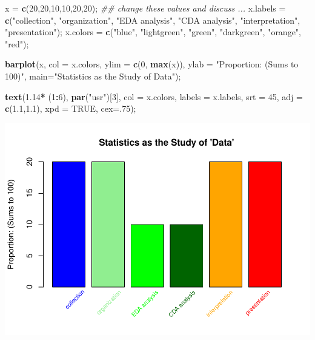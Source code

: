 \documentclass[
]{article}
\newenvironment{Shaded}{\begin{snugshade}}{\end{snugshade}}
\newcommand{\CommentTok}[1]{\textcolor[rgb]{0.56,0.35,0.01}{\textit{#1}}}
\newcommand{\DataTypeTok}[1]{\textcolor[rgb]{0.13,0.29,0.53}{#1}}
\newcommand{\DecValTok}[1]{\textcolor[rgb]{0.00,0.00,0.81}{#1}}
\newcommand{\FloatTok}[1]{\textcolor[rgb]{0.00,0.00,0.81}{#1}}
\newcommand{\KeywordTok}[1]{\textcolor[rgb]{0.13,0.29,0.53}{\textbf{#1}}}
\newcommand{\NormalTok}[1]{#1}
\newcommand{\OperatorTok}[1]{\textcolor[rgb]{0.81,0.36,0.00}{\textbf{#1}}}
\newcommand{\OtherTok}[1]{\textcolor[rgb]{0.56,0.35,0.01}{#1}}
\newcommand{\StringTok}[1]{\textcolor[rgb]{0.31,0.60,0.02}{#1}}
\begin{document}
\begin{Shaded}
\begin{Highlighting}[]
\NormalTok{x =}\StringTok{ }\KeywordTok{c}\NormalTok{(}\DecValTok{20}\NormalTok{,}\DecValTok{20}\NormalTok{,}\DecValTok{10}\NormalTok{,}\DecValTok{10}\NormalTok{,}\DecValTok{20}\NormalTok{,}\DecValTok{20}\NormalTok{);  }\CommentTok{\#\# change these values and discuss ...}
\NormalTok{x.labels =}\StringTok{ }\KeywordTok{c}\NormalTok{(}\StringTok{"collection"}\NormalTok{, }\StringTok{"organization"}\NormalTok{, }\StringTok{"EDA analysis"}\NormalTok{, }\StringTok{"CDA analysis"}\NormalTok{, }\StringTok{"interpretation"}\NormalTok{, }\StringTok{"presentation"}\NormalTok{);}
\NormalTok{x.colors =}\StringTok{ }\KeywordTok{c}\NormalTok{(}\StringTok{"blue"}\NormalTok{, }\StringTok{"lightgreen"}\NormalTok{, }\StringTok{"green"}\NormalTok{, }\StringTok{"darkgreen"}\NormalTok{, }\StringTok{"orange"}\NormalTok{, }\StringTok{"red"}\NormalTok{);}

\KeywordTok{barplot}\NormalTok{(x, }
        \DataTypeTok{col =}\NormalTok{ x.colors,}
        \DataTypeTok{ylim =} \KeywordTok{c}\NormalTok{(}\DecValTok{0}\NormalTok{, }\KeywordTok{max}\NormalTok{(x)),}
        \DataTypeTok{ylab =} \StringTok{"Proportion: (Sums to 100)"}\NormalTok{,}
        \DataTypeTok{main=}\StringTok{"Statistics as the Study of \textquotesingle{}Data\textquotesingle{}"}\NormalTok{);}


\KeywordTok{text}\NormalTok{(}\FloatTok{1.14}\OperatorTok{*}\StringTok{ }\NormalTok{(}\DecValTok{1}\OperatorTok{:}\DecValTok{6}\NormalTok{), }\KeywordTok{par}\NormalTok{(}\StringTok{"usr"}\NormalTok{)[}\DecValTok{3}\NormalTok{], }\DataTypeTok{col =}\NormalTok{ x.colors, }\DataTypeTok{labels =}\NormalTok{ x.labels, }\DataTypeTok{srt =} \DecValTok{45}\NormalTok{, }\DataTypeTok{adj =} \KeywordTok{c}\NormalTok{(}\FloatTok{1.1}\NormalTok{,}\FloatTok{1.1}\NormalTok{), }\DataTypeTok{xpd =} \OtherTok{TRUE}\NormalTok{, }\DataTypeTok{cex=}\NormalTok{.}\DecValTok{75}\NormalTok{);}
\end{Highlighting}
\end{Shaded}

\includegraphics{graphics/chunk-conclusion-student-perspective-1.pdf}
\end{document}
